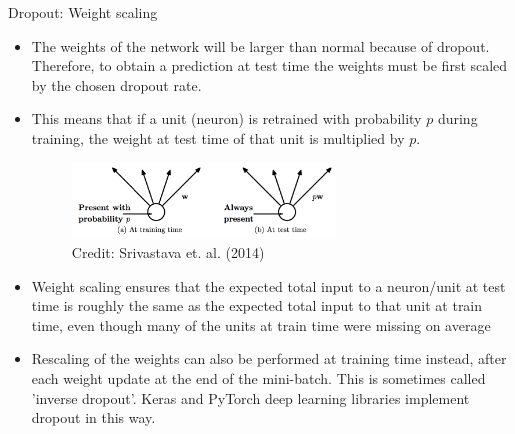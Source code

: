 \begin{vbframe}{Dropout: Weight scaling}
  \begin{itemize}
    \item The weights of the network will be larger than normal because of dropout. Therefore, to obtain a prediction at test time the weights must be first scaled by the chosen dropout rate.
    \item This means that if a unit (neuron) is retrained with probability $p$ during training, the weight at test time of that unit is multiplied by $p$.
  \begin{figure}
      \centering
    \includegraphics[width=7cm]{figure/dropout_neuron.png}
    \tiny{\\ Credit: Srivastava et. al. (2014)}
  \end{figure}
  \item Weight scaling ensures that the expected total input to a neuron/unit at test time is roughly the same as the expected total input to that unit at train time, even though many of the units at train time were missing on average
  \item Rescaling of the weights can also be performed at training time instead, after each weight update at the end of the mini-batch. This is sometimes called 'inverse dropout'. Keras and PyTorch deep learning libraries implement dropout in this way.
  \end{itemize}
\end{vbframe}

